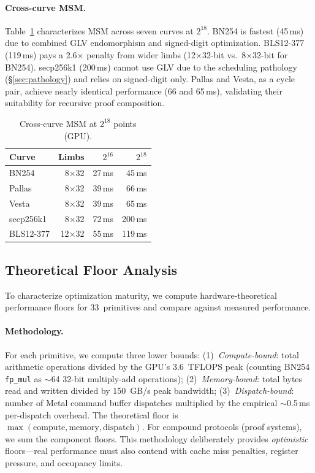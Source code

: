 \paragraph{Cross-curve MSM.}
Table~\ref{tab:cross-curve-msm} characterizes MSM across seven curves at $2^{18}$.
BN254 is fastest (45\,ms) due to combined GLV endomorphism and signed-digit optimization.
BLS12-377 (119\,ms) pays a 2.6$\times$ penalty from wider limbs (12$\times$32-bit vs.\ 8$\times$32-bit for BN254).
secp256k1 (200\,ms) cannot use GLV due to the scheduling pathology (\S\ref{sec:pathology}) and relies on signed-digit only.
Pallas and Vesta, as a cycle pair, achieve nearly identical performance (66 and 65\,ms), validating their suitability for recursive proof composition.

\begin{table}[t]
\centering
\small
\caption{Cross-curve MSM at $2^{18}$ points (GPU).}
\label{tab:cross-curve-msm}
\begin{tabular}{lrrr}
\toprule
Curve & Limbs & $2^{16}$ & $2^{18}$ \\
\midrule
BN254 & 8$\times$32 & 27\,ms & 45\,ms \\
Pallas & 8$\times$32 & 39\,ms & 66\,ms \\
Vesta & 8$\times$32 & 39\,ms & 65\,ms \\
secp256k1 & 8$\times$32 & 72\,ms & 200\,ms \\
BLS12-377 & 12$\times$32 & 55\,ms & 119\,ms \\
\bottomrule
\end{tabular}
\end{table}

\subsection{Theoretical Floor Analysis}
\label{sec:floors}

To characterize optimization maturity, we compute hardware-theoretical performance floors for 33~primitives and compare against measured performance.

\paragraph{Methodology.}
For each primitive, we compute three lower bounds:
(1)~\emph{Compute-bound}: total arithmetic operations divided by the GPU's 3.6~TFLOPS peak (counting BN254 \texttt{fp\_mul} as $\sim$64 32-bit multiply-add operations);
(2)~\emph{Memory-bound}: total bytes read and written divided by 150~GB/s peak bandwidth;
(3)~\emph{Dispatch-bound}: number of Metal command buffer dispatches multiplied by the empirical $\sim$0.5\,ms per-dispatch overhead.
The theoretical floor is $\max(\text{compute}, \text{memory}, \text{dispatch})$.
For compound protocols (proof systems), we sum the component floors.
This methodology deliberately provides \emph{optimistic} floors---real performance must also contend with cache miss penalties, register pressure, and occupancy limits.

